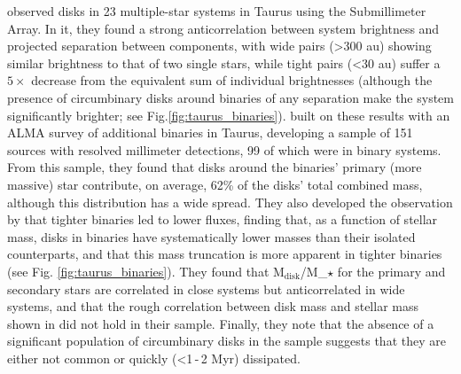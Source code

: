 \citet{Harris2012} observed disks in 23 multiple-star systems in Taurus using the Submillimeter Array. In it, they found a strong anticorrelation between system brightness and projected separation between components, with wide pairs (\textgreater300 au) showing similar brightness to that of two single stars, while tight pairs (\textless30 au) suffer a $5\times$ decrease from the equivalent sum of individual brightnesses (although the presence of circumbinary disks around binaries of any separation make the system significantly brighter; see Fig.\ref{fig:taurus_binaries}). \citet{Akeson2019} built on these results with an ALMA survey of additional binaries in Taurus, developing a sample of 151 sources with resolved millimeter detections, 99 of which were in binary systems. From this sample, they found that disks around the binaries' primary (more massive) star contribute, on average, 62\% of the disks' total combined mass, although this distribution has a wide spread. They also developed the observation by \citet{Harris2012} \citep[and previously in][]{Jensen1996} that tighter binaries led to lower fluxes, finding that, as a function of stellar mass, disks in binaries have systematically lower masses than their isolated counterparts, and that this mass truncation is more apparent in tighter binaries (see Fig. \ref{fig:taurus_binaries}). They found that M$_\text{disk}$/M_$\star$ for the primary and secondary stars are correlated in close systems but anticorrelated in wide systems, and that the rough correlation between disk mass and stellar mass shown in \citet{Andrews2013} did not hold in their sample. Finally, they note that the absence of a significant population of circumbinary disks in the sample suggests that they are either not common or quickly (\textless1\,-\,2 Myr) dissipated.



